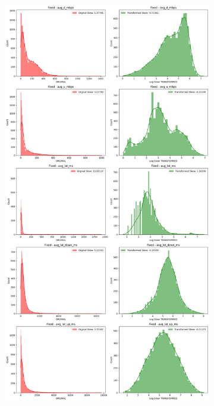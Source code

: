 \documentclass[
  letterpaper,
  DIV=11,
  numbers=noendperiod,
  oneside]{scrartcl}
\begin{document}
\begin{figure}
{\begin{figure}[H]
\end{figure}

\begin{figure}[H]

{\centering \includegraphics{data-analytics_files/figure-latex/fig-transcomp-output-3.png}

}


\end{figure}}
\end{figure}
\end{document}
